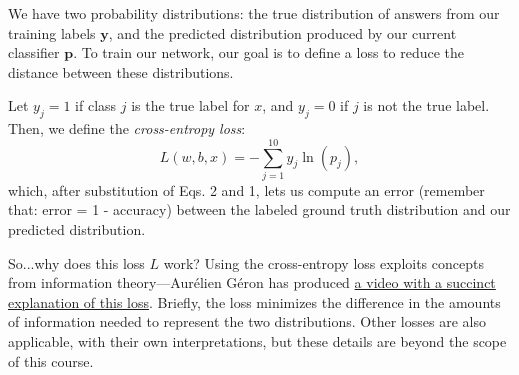We have two probability distributions: the true distribution of answers from our training labels $\mathbf{y}$, and the predicted distribution produced by our current classifier $\mathbf{p}$. To train our network, our goal is to define a loss to reduce the distance between these distributions.

Let $y_j=1$ if class $j$ is the true label for $x$, and $y_j = 0$ if $j$ is not the true label. Then, we define the \emph{cross-entropy loss}:
\begin{equation}
    L(w,b,x) = - \sum_{j=1}^{10}y_j\ln(p_j),
\end{equation}
which, after substitution of Eqs. 2 and 1, lets us compute an error (remember that: error = 1 - accuracy) between the labeled ground truth distribution and our predicted distribution.

So...why does this loss $L$ work? Using the cross-entropy loss exploits concepts from information theory---Aur\'{e}lien G\'{e}ron has produced \href{https://www.youtube.com/watch?v=ErfnhcEV1O8}{a video with a succinct explanation of this loss}. Briefly, the loss minimizes the difference in the amounts of information needed to represent the two distributions. Other losses are also applicable, with their own interpretations, but these details are beyond the scope of this course.

%
%
%
%
%
%

